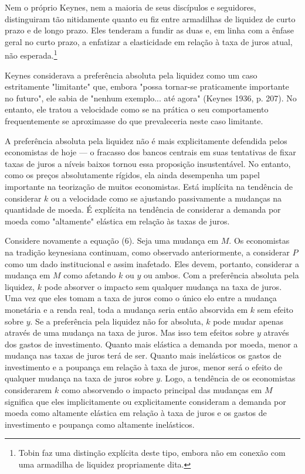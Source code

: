 \documentclass[12pt]{article}
\begin{document}
Nem o próprio Keynes, nem a maioria de seus discípulos e seguidores, distinguiram tão nitidamente quanto eu fiz entre armadilhas de liquidez de curto prazo e de longo prazo. Eles tenderam a fundir as duas e, em linha com a ênfase geral no curto prazo, a enfatizar a elasticidade em relação à taxa de juros atual, não esperada.\footnote{Tobin faz uma distinção explícita deste tipo, embora não em conexão com uma armadilha de liquidez propriamente dita.}

Keynes considerava a preferência absoluta pela liquidez como um caso estritamente "limitante" que, embora "possa tornar-se praticamente importante no futuro", ele sabia de "nenhum exemplo... até agora" (Keynes 1936, p. 207). No entanto, ele tratou a velocidade como se na prática o seu comportamento frequentemente se aproximasse do que prevaleceria neste caso limitante.

A preferência absoluta pela liquidez não é mais explicitamente defendida pelos economistas de hoje — o fracasso dos bancos centrais em suas tentativas de fixar taxas de juros a níveis baixos tornou essa proposição insustentável. No entanto, como os preços absolutamente rígidos, ela ainda desempenha um papel importante na teorização de muitos economistas. Está implícita na tendência de considerar $k$ ou a velocidade como se ajustando passivamente a mudanças na quantidade de moeda. É explícita na tendência de considerar a demanda por moeda como "altamente" elástica em relação às taxas de juros.

Considere novamente a equação (6). Seja uma mudança em $M$. Os economistas na tradição keynesiana continuam, como observado anteriormente, a considerar $P$ como um dado institucional e assim inafetado. Eles devem, portanto, considerar a mudança em $M$ como afetando $k$ ou $y$ ou ambos. Com a preferência absoluta pela liquidez, $k$ pode absorver o impacto sem qualquer mudança na taxa de juros. Uma vez que eles tomam a taxa de juros como o único elo entre a mudança monetária e a renda real, toda a mudança seria então absorvida em $k$ sem efeito sobre $y$. Se a preferência pela liquidez não for absoluta, $k$ pode mudar apenas através de uma mudança na taxa de juros. Mas isso tem efeitos sobre $y$ através dos gastos de investimento. Quanto mais elástica a demanda por moeda, menor a mudança nas taxas de juros terá de ser. Quanto mais inelásticos os gastos de investimento e a poupança em relação à taxa de juros, menor será o efeito de qualquer mudança na taxa de juros sobre $y$. Logo, a tendência de os economistas considerarem $k$ como absorvendo o impacto principal das mudanças em $M$ significa que eles implicitamente ou explicitamente consideram a demanda por moeda como altamente elástica em relação à taxa de juros e os gastos de investimento e poupança como altamente inelásticos.
\end{document}
